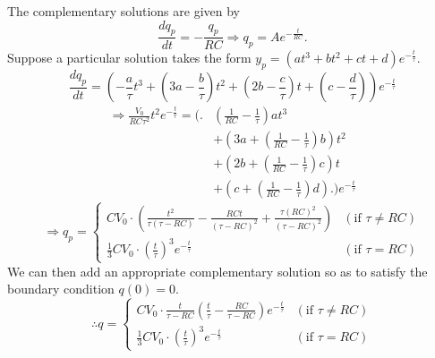 \item

The complementary solutions are given by
\[
	\frac{dq_p}{dt} = -\frac{q_p}{RC}
	\Rightarrow q_p = A e^{-\frac{t}{RC}}.
\]
Suppose a particular solution takes the form $y_p = (at^3 + bt^2 + ct + d)e^{-\frac{t}{\tau}}$.
\[
	\frac{dq_p}{dt} = \left( -\frac{a}{\tau}t^3 + \left( 3a - \frac{b}{\tau} \right)t^2 + \left( 2b - \frac{c}{\tau} \right)t + \left( c - \frac{d}{\tau} \right) \right) e^{-\frac{t}{\tau}}
\]
\begin{align*}
	\Rightarrow \frac{V_0}{RC\tau^2}t^2 e^{-\frac{t}{\tau}}
	= \Biggl(\Biggr.
		&\left( \frac{1}{RC} - \frac{1}{\tau} \right)at^3 \\
		&+ \left( 3a + \left( \frac{1}{RC} - \frac{1}{\tau} \right)b \right)t^2 \\
		&+ \left( 2b + \left( \frac{1}{RC} - \frac{1}{\tau} \right)c \right)t \\
		&+ \left(  c + \left( \frac{1}{RC} - \frac{1}{\tau} \right)d\right)
	\Biggl.\Biggr) e^{-\frac{t}{\tau}}
\end{align*}
\[
	\Rightarrow q_p =
	\begin{cases}
		CV_0 \cdot \left(
			\frac{t^2}{\tau (\tau - RC)} - \frac{RCt}{{(\tau - RC)}^2} + \frac{\tau {(RC)}^2}{{(\tau - RC)}^2}
		\right)
		& (\text{if } \tau \neq RC) \\
		\frac{1}{3} CV_0 \cdot {\left( \frac{t}{\tau} \right)}^3 e^{-\frac{t}{\tau}}
		& (\text{if } \tau = RC)
	\end{cases}
\]
We can then add an appropriate complementary solution so as to satisfy the boundary condition $q(0) = 0$.
\[
	\therefore q =
	\begin{cases}
		CV_0 \cdot \frac{t}{\tau - RC} \left( \frac{t}{\tau} - \frac{RC}{\tau - RC} \right) e^{-\frac{t}{\tau}}
		& (\text{if } \tau \neq RC) \\
		\frac{1}{3} CV_0 \cdot {\left( \frac{t}{\tau} \right)}^3 e^{-\frac{t}{\tau}}
		& (\text{if } \tau = RC)
	\end{cases}
\]
